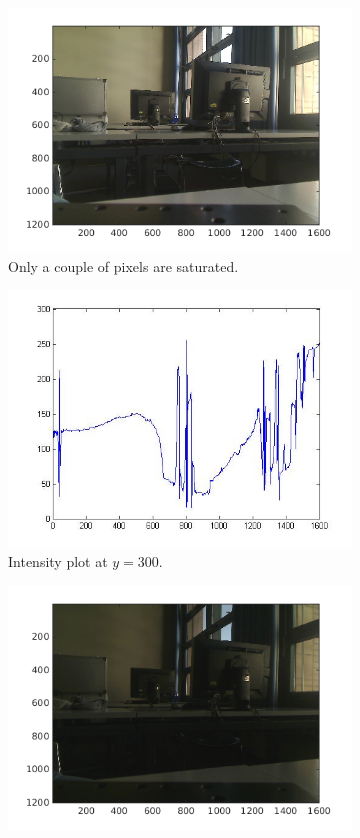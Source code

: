 \documentclass[a4paper, 12pt]{paper}
\begin{document}
\begin{figure}[h]
\begin{subfigure}[p]{0.45\textwidth}
        \includegraphics[width=\textwidth]{img/little_sat}
        \caption{Only a couple of pixels are saturated.}
    \end{subfigure}
    \begin{subfigure}[p]{0.45\textwidth}
        \includegraphics[width=\textwidth]{img/little_int}
        \caption{Intensity plot at $y=300$.}
    \end{subfigure}
    \centering
    \begin{subfigure}[p]{0.45\textwidth}
        \includegraphics[width=\textwidth]{img/no_sat}

\end{subfigure}
\end{figure}
\end{document}
